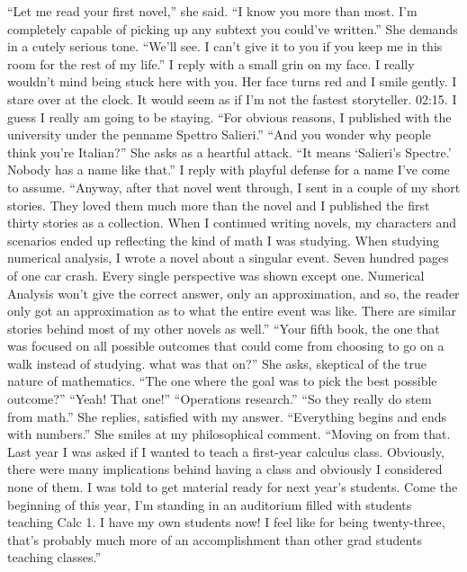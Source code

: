\documentclass[a4paper, 12pt]{book}
\newcommand\tab[1][1cm]{\hspace*{#1}}
\begin{document}
\newline
\tab
“Let me read your first novel,” she said. “I know you more than most. I’m completely capable of picking up any subtext you could’ve written.” She demands in a cutely serious tone.
\newline
\tab
“We’ll see. I can’t give it to you if you keep me in this room for the rest of my life.” I reply with a small grin on my face. I really wouldn’t mind being stuck here with you. Her face turns red and I smile gently. I stare over at the clock. It would seem as if I’m not the fastest storyteller. 02:15. I guess I really am going to be staying. “For obvious reasons, I published with the university under the penname Spettro Salieri.”
\newline
\tab
“And you wonder why people think you’re Italian?” She asks as a heartful attack.
\newline
\tab
“It means ‘Salieri’s Spectre.’ Nobody has a name like that.” I reply with playful defense for a name I’ve come to assume. “Anyway, after that novel went through, I sent in a couple of my short stories. They loved them much more than the novel and I published the first thirty stories as a collection. When I continued writing novels, my characters and scenarios ended up reflecting the kind of math I was studying. When studying numerical analysis, I wrote a novel about a singular event. Seven hundred pages of one car crash. Every single perspective was shown except one. Numerical Analysis won’t give the correct answer, only an approximation, and so, the reader only got an approximation as to what the entire event was like. There are similar stories behind most of my other novels as well.”
\newline
\tab
“Your fifth book, the one that was focused on all possible outcomes that could come from choosing to go on a walk instead of studying. what was that on?” She asks, skeptical of the true nature of mathematics.
\newline
\tab
“The one where the goal was to pick the best possible outcome?” 
\newline
\tab
“Yeah! That one!”
\newline
\tab
“Operations research.”
\newline
\tab
“So they really do stem from math.” She replies, satisfied with my answer.
\newline
\tab
“Everything begins and ends with numbers.” She smiles at my philosophical comment. “Moving on from that. Last year I was asked if I wanted to teach a first-year calculus class. Obviously, there were many implications behind having a class and obviously I considered none of them. I was told to get material ready for next year’s students. Come the beginning of this year, I’m standing in an auditorium filled with students teaching Calc 1. I have my own students now! I feel like for being twenty-three, that’s probably much more of an accomplishment than other grad students teaching classes.”
\end{document}
